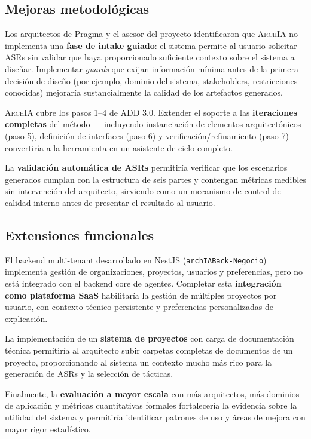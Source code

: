 \documentclass[12pt, letterpaper, oneside]{article}
\newcommand{\archia}{\textsc{ArchIA}}
\begin{document}
\subsection*{Mejoras metodológicas}

Los arquitectos de Pragma y el asesor del proyecto identificaron que \archia{} no
implementa una \textbf{fase de intake guiado}: el sistema permite al usuario
solicitar ASRs sin validar que haya proporcionado suficiente contexto sobre el
sistema a diseñar. Implementar \emph{guards} que exijan información mínima antes de
la primera decisión de diseño (por ejemplo, dominio del sistema, stakeholders,
restricciones conocidas) mejoraría sustancialmente la calidad de los artefactos
generados.

\archia{} cubre los pasos 1--4 de ADD 3.0. Extender el soporte a las
\textbf{iteraciones completas} del método --- incluyendo instanciación de
elementos arquitectónicos (paso 5), definición de interfaces (paso 6) y
verificación/refinamiento (paso 7) --- convertiría a la herramienta en un
asistente de ciclo completo.

La \textbf{validación automática de ASRs} permitiría verificar que los escenarios
generados cumplan con la estructura de seis partes y contengan métricas medibles
sin intervención del arquitecto, sirviendo como un mecanismo de control de calidad
interno antes de presentar el resultado al usuario.

\subsection*{Extensiones funcionales}

El backend multi-tenant desarrollado en NestJS
(\texttt{archIABack-Negocio}) implementa gestión de organizaciones, proyectos,
usuarios y preferencias, pero no está integrado con el backend core de agentes.
Completar esta \textbf{integración como plataforma SaaS} habilitaría la gestión
de múltiples proyectos por usuario, con contexto técnico persistente y
preferencias personalizadas de explicación.

La implementación de un \textbf{sistema de proyectos} con carga de documentación
técnica permitiría al arquitecto subir carpetas completas de documentos de un
proyecto, proporcionando al sistema un contexto mucho más rico para la generación
de ASRs y la selección de tácticas.

Finalmente, la \textbf{evaluación a mayor escala} con más arquitectos, más
dominios de aplicación y métricas cuantitativas formales fortalecería la
evidencia sobre la utilidad del sistema y permitiría identificar patrones de
uso y áreas de mejora con mayor rigor estadístico.
\end{document}
